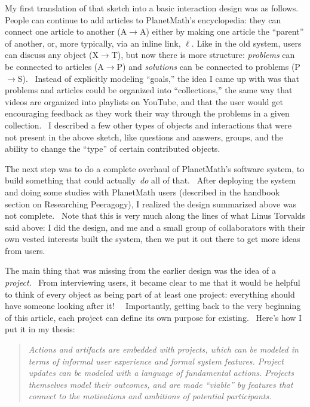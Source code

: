 My first translation of that sketch into a basic interaction design
was as follows.~ People can continue to add articles to PlanetMath's
encyclopedia: they can connect one article to another
(A$\rightarrow$A) either by making one article the ``parent'' of
another, or, more typically, via an inline link, $\ell$. Like in the
old system, users can discuss any object (X$\rightarrow$T), but now
there is more structure: \emph{problems} can be connected to articles
(A$\rightarrow$P) and \emph{solutions} can be connected to problems (P
$\rightarrow$S).~ Instead of explicitly modeling ``goals,'' the idea I
came up with was that problems and articles could be organized into
``collections,'' the same way that videos are organized into playlists
on YouTube, and that the user would get encouraging feedback as they
work their way through the problems in a given collection.~ I
described a few other types of objects and interactions that were not
present in the above sketch, like questions and answers, groups, and
the ability to change the ``type'' of certain contributed objects.~

The next step was to do a complete overhaul of PlanetMath's software
system, to build something that could actually~\emph{do} all of that.~
After deploying the system and doing some studies with PlanetMath
users (described in the handbook section on Researching Peeragogy), I
realized the design summarized above was not complete.~ Note that this
is very much along the lines of what Linus Torvalds said above: I did
the design, and me and a small group of collaborators with their own
vested interests built the system, then we put it out there to get
more ideas from users. 

The main thing that was missing from the earlier design was the idea
of a \emph{project}.~ From interviewing users, it became clear to me
that it would be helpful to think of every object as being part of at
least one project: everything should have someone looking after it!~~
Importantly, getting back to the very beginning of this article, each
project can define its own purpose for existing.~ Here's how I put it
in my thesis:

\begin{quote}
\emph{Actions and artifacts are embedded with projects, which can be
modeled in terms of informal user experience and formal system features.
Project updates can be modeled with a language of fundamental actions.
Projects themselves model their outcomes, and are made ``viable'' by
features that connect to the motivations and ambitions of potential
participants.}
\end{quote}


